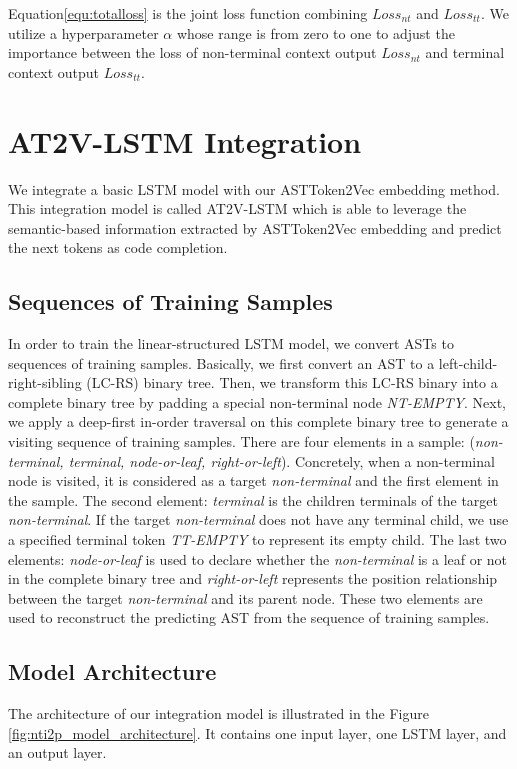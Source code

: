 \documentclass[E]{compsoft}
\begin{document}
Equation\ref{equ:totalloss} is the joint loss function combining $Loss_{nt}$ and $Loss_{tt}$. 
We utilize a hyperparameter $\alpha$ whose range is from zero to one to adjust the importance between the loss of non-terminal context output $Loss_{nt}$ and terminal context output $Loss_{tt}$.




\section{AT2V-LSTM Integration}
\label{section:n2v-lstm-integration}
We integrate a basic LSTM model with our ASTToken2Vec embedding method. This integration model is called AT2V-LSTM which is able to leverage the semantic-based information extracted by ASTToken2Vec embedding and predict the next tokens as code completion.


\subsection{Sequences of Training Samples}
In order to train the linear-structured LSTM model, we convert ASTs to sequences of training samples.
Basically, we first convert an AST to a left-child-right-sibling (LC-RS) binary tree. 
Then, we transform this LC-RS binary into a complete binary tree by padding a special non-terminal node \textit{NT-EMPTY}.
Next, we apply a deep-first in-order traversal on this complete binary tree to generate a visiting sequence of training samples. 
There are four elements in a sample: (\textit{non-terminal, terminal, node-or-leaf, right-or-left}).
Concretely, when a non-terminal node is visited, it is considered as a target \textit{non-terminal} and the first element in the sample.
The second element: \textit{terminal} is the children terminals of the target \textit{non-terminal}.
If the target \textit{non-terminal} does not have any terminal child, we use a specified terminal token \textit{TT-EMPTY} to represent its empty child.
The last two elements: \textit{node-or-leaf} is used to declare whether the \textit{non-terminal} is a leaf or not in the complete binary tree and \textit{right-or-left} represents the position relationship between the target \textit{non-terminal} and its parent node. 
These two elements are used to reconstruct the predicting AST from the sequence of training samples.



\subsection{Model Architecture}
The architecture of our integration model is illustrated in the Figure \ref{fig:nti2p_model_architecture}. 
It contains one input layer, one LSTM layer, and an output layer. 
\end{document}
